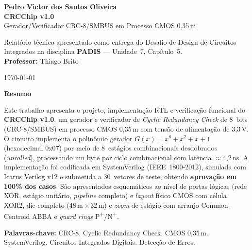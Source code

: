 \documentclass[12pt,a4paper]{article}
\newenvironment{resumoenv}{%
  \begin{center}\textbf{Resumo}\end{center}\small\setlength{\parindent}{0pt}}{}
\begin{document}
\newpage

\thispagestyle{empty}
\begin{center}
  \vspace*{2cm}
  {\large\bfseries Pedro Victor dos Santos Oliveira}\\[60pt]
  {\Large\bfseries\color{crcblue} CRCChip v1.0}\\[10pt]
  {\large Gerador/Verificador CRC-8/SMBUS em Processo CMOS 0,35\,\textmu m}\\[60pt]

  \begin{flushright}
    \begin{minipage}{8cm}
      Relatório técnico apresentado como entrega do Desafio de Design de Circuitos Integrados
      na disciplina \textbf{PADIS} --- Unidade~7, Capítulo~5.\\[12pt]
      \textbf{Professor:} Thiago Brito
    \end{minipage}
  \end{flushright}

  \vfill
  {\normalsize \today}
\end{center}
\newpage

\thispagestyle{empty}
\begin{resumoenv}
Este trabalho apresenta o projeto, implementação RTL e verificação funcional do \textbf{CRCChip v1.0}, um gerador e verificador de \textit{Cyclic Redundancy Check} de 8~bits (CRC-8/SMBUS) em processo CMOS 0,35\,\textmu m com tensão de alimentação de 3,3\,V. O circuito implementa o polinômio gerador $G(x) = x^8 + x^2 + x + 1$ (hexadecimal 0x07) por meio de 8~estágios combinacionais desdobrados (\textit{unrolled}), processando um byte por ciclo combinacional com latência $\approx$4,2\,ns. A implementação foi codificada em SystemVerilog (IEEE~1800-2012), simulada com Icarus Verilog v12 e submetida a 30~vetores de teste, obtendo \textbf{aprovação em 100\% dos casos}. São apresentados esquemáticos ao nível de portas lógicas (rede XOR, estágio unitário, \textit{pipeline} completo) e \textit{layout} físico CMOS com célula XOR2, die completo (48\,\textmu m\,$\times$\,32\,\textmu m) e \textit{zoom} de estágio com arranjo Common-Centroid ABBA e \textit{guard rings} P\textsuperscript{+}/N\textsuperscript{+}.
\end{resumoenv}

\vspace{1.0cm}
\noindent\textbf{Palavras-chave:} CRC-8. Cyclic Redundancy Check. CMOS 0,35\,\textmu m. SystemVerilog. Circuitos Integrados Digitais. Detecção de Erros.
\end{document}
